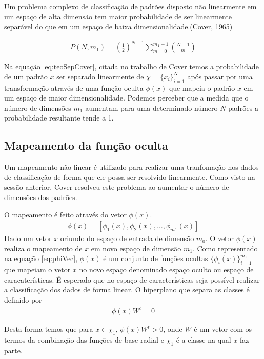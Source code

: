 \documentclass[
	article,			%
	11pt,				%
	oneside,			%
	a4paper,			%
	english,			%
	brazil,				%
	sumario=tradicional
	]{abntex2}
\begin{document}
\begin{citacao}
Um problema complexo de classificação de padrões disposto não linearmente em um
espaço de alta dimensão tem maior probabilidade de ser linearmente separável do
que em um espaço de baixa dimensionalidade.(Cover, 1965) 
\end{citacao}

\begin{align}
P(N,m_1) = \left(\frac{1}{2}\right)^{N-1}   
\sum_{m=0}^{m_1-1}   
\binom{N-1}{m}
\label{eq:teoSepCover}
\end{align}

Na equação \ref{eq:teoSepCover}, citada no trabalho de Cover temos a
probabilidade de um padrão $x$ ser separado linearmente de $\chi=\{x_i\}_{i=1}^{N}$ após passar por uma
transformação através de uma função oculta $\phi(x)$ que mapeia o padrão $x$ em
um espaço de maior dimensionalidade.
Podemos perceber que a medida que o número de dimensões $m_1$ aumentam para uma
determinado número $N$ padrões a probabilidade resultante tende a 1.


\subsection{Mapeamento da função oculta}
Um mapeamento não linear é utilizado para realizar uma tranfomação nos dados de
classificação de forma que ele possa ser resolvido linearmente. Como visto na
sessão anterior, Cover resolveu este problema ao aumentar o número de dimensões
dos padrões.

O mapeamento é feito através do vetor $\phi(x)$.
\begin{align}
\phi(x) = [ \phi_1(x), \phi_2(x), \ldots, \phi_{m1}(x) ] 
\label{eq:phiVec}
\end{align}
Dado um vetor $x$ oriundo do espaço de entrada de dimensão $m_0$. O vetor
$\phi(x)$ realiza o mapeamento de $x$ em novo espaço de dimensão $m_1$. Como
representado na equação \ref{eq:phiVec}, $\phi(x)$ é um conjunto de funções
ocultas $\{\phi_i(x)\}^{m_1}_{i=1}$ que mapeiam o vetor $x$ no novo espaço
denominado espaço oculto ou espaço de caracaterísticas. É esperado que no espaço
de características seja possível realizar a classificação dos dados de forma
linear. O hiperplano que separa as classes é definido por
\begin{align}
\phi(x)W^t=0
\end{align} 

Desta forma temos que para $x \in \chi_1 $, $\phi(x)W^t>0$, onde $W$ é um
vetor com os termos da combinação das funções de base radial e $\chi_1$ é a
classe na qual $x$ faz parte.
\end{document}
